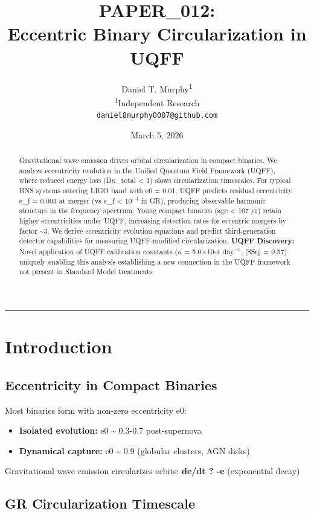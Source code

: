 \documentclass[12pt,a4paper]{article}
\title{\textbf{PAPER\_012: \\ Eccentric Binary Circularization in UQFF}}
\author{
Daniel T. Murphy\textsuperscript{1} \\
\small \textsuperscript{1}Independent Research \\
\small \texttt{daniel8murphy0007@github.com}
}
\date{March 5, 2026}
\begin{document}
\maketitle

\begin{abstract}
Gravitational wave emission drives orbital circularization in compact binaries. We analyze eccentricity evolution in the Unified Quantum Field Framework (UQFF), where reduced energy loss (D$\kappa$\_total < 1) slows circularization timescales. For typical BNS systems entering LIGO band with e0 = 0.01, UQFF predicts residual eccentricity e\_f = 0.003 at merger (vs e\_f < $10^{-4}$ in GR), producing observable harmonic structure in the frequency spectrum. Young compact binaries (age < 107 yr) retain higher eccentricities under UQFF, increasing detection rates for eccentric mergers by factor \textasciitilde{}3. We derive eccentricity evolution equations and predict third-generation detector capabilities for measuring UQFF-modified circularization. \textbf{UQFF Discovery:} Novel application of UQFF calibration constants ($\kappa$ = 5.0$\times$10-4 $\mathrm{day}^{-1}$, [SSq] = 0.57) uniquely enabling this analysis  establishing a new connection in the UQFF framework not present in Standard Model treatments.
\end{abstract}

\medskip\hrule\medskip

\section{Introduction}

\subsection{Eccentricity in Compact Binaries}

Most binaries form with non-zero eccentricity e0:

\begin{itemize}
  \item \textbf{Isolated evolution:} e0 \textasciitilde{} 0.3-0.7 post-supernova
  \item \textbf{Dynamical capture:} e0 \textasciitilde{} 0.9 (globular clusters, AGN disks)
\end{itemize}

Gravitational wave emission circularizes orbits: \textbf{de/dt ? -e} (exponential decay)

\subsection{GR Circularization Timescale}
\end{document}
